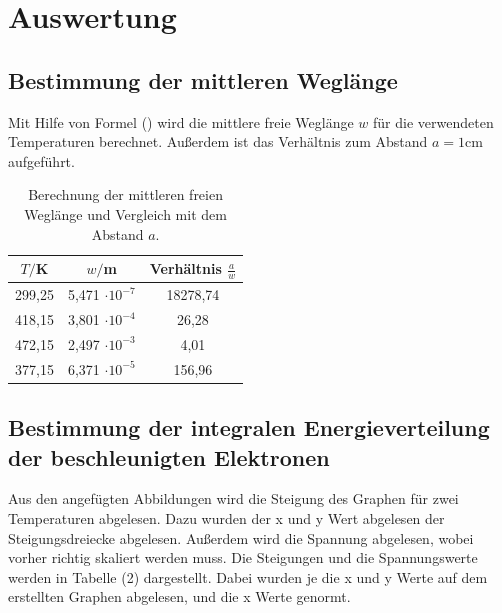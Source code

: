 
\section{Auswertung}
\label{sec:Auswertung}

\subsection{Bestimmung der mittleren Weglänge}
Mit Hilfe von Formel () wird die mittlere freie Weglänge $w$ für die verwendeten Temperaturen berechnet. Außerdem ist das Verhältnis zum Abstand $a = 1 \si{\cm}$ aufgeführt.
\begin{table}[H]
  \centering
  \caption{Berechnung der mittleren freien Weglänge und Vergleich mit dem Abstand $a$.}
  \label{tab:Parameter}
  \begin{tabular}{c c c}
    \toprule
    $T/$K& $w/$m  & Verhältnis $\frac{a}{w}$ \\
    \bottomrule
    299,25 & 5,471 $\cdot 10^{-7}$ & 18278,74 \\
    418,15 & 3,801 $\cdot 10^{-4}$ & 26,28\\
    472,15 & 2,497 $\cdot 10^{-3}$ & 4,01\\
    377,15 & 6,371 $\cdot 10^{-5}$ & 156,96\\
     \bottomrule
  \end{tabular}
\end{table}


\subsection{Bestimmung der integralen Energieverteilung der beschleunigten Elektronen}

Aus den angefügten Abbildungen wird die Steigung des Graphen für zwei Temperaturen abgelesen. 
Dazu wurden der x und y Wert abgelesen der Steigungsdreiecke abgelesen. Außerdem wird die Spannung abgelesen, wobei vorher richtig skaliert werden muss. Die Steigungen und die Spannungswerte werden in Tabelle (2) dargestellt.
Dabei wurden je die x und y Werte auf dem erstellten Graphen abgelesen, und die x Werte genormt.

